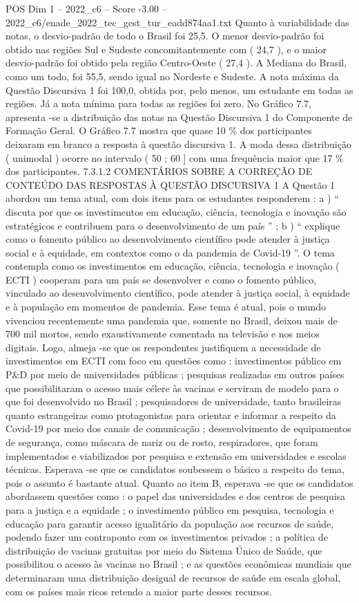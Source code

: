 \begin{textsample}{POS Dim 1 – 2022\_c6 – Score -3.00 – 2022\_c6/enade\_2022\_tec\_gest\_tur\_eadd874aa1.txt}
Quanto à variabilidade das notas, o desvio-padrão de todo o Brasil foi 25,5.
O menor desvio-padrão foi obtido nas regiões Sul e Sudeste concomitantemente com ( 24,7 ), e o maior desvio-padrão foi obtido pela região Centro-Oeste ( 27,4 ).
A Mediana do Brasil, como um todo, foi 55,5, sendo igual no Nordeste e Sudeste.
A nota máxima da Questão Discursiva 1 foi 100,0, obtida por, pelo menos, um estudante em todas as regiões.
Já a nota mínima para todas as regiões foi zero.
No Gráfico 7.7, apresenta -se a distribuição das notas na Questão Discursiva 1 do Componente de Formação Geral.
O Gráfico 7.7 mostra que quase 10 \% dos participantes deixaram em branco a resposta à questão discursiva 1.
A moda dessa distribuição ( unimodal ) ocorre no intervalo ( 50 ; 60 ] com uma frequência maior que 17 \% dos participantes. 7.3.1.2 COMENTÁRIOS SOBRE A CORREÇÃO DE CONTEÚDO DAS RESPOSTAS À QUESTÃO DISCURSIVA 1 A Questão 1 abordou um tema atual, com dois itens para os estudantes responderem : a ) “ discuta por que os investimentos em educação, ciência, tecnologia e inovação são estratégicos e contribuem para o desenvolvimento de um país ” ; b ) “ explique como o fomento público ao desenvolvimento científico pode atender à justiça social e à equidade, em contextos como o da pandemia de Covid-19 ”.
O tema contempla como os investimentos em educação, ciência, tecnologia e inovação ( ECTI ) cooperam para um país se desenvolver e como o fomento público, vinculado ao desenvolvimento científico, pode atender à justiça social, à equidade e à população em momentos de pandemia.
Esse tema é atual, pois o mundo vivenciou recentemente uma pandemia que, somente no Brasil, deixou mais de 700 mil mortos, sendo exaustivamente comentada na televisão e nos meios digitais.
Logo, almeja -se que os respondentes justifiquem a necessidade de investimentos em ECTI com foco em questões como : investimentos público em P\&D por meio de universidades públicas ; pesquisas realizadas em outros países que possibilitaram o acesso mais célere às vacinas e serviram de modelo para o que foi desenvolvido no Brasil ; pesquisadores de universidade, tanto brasileiras quanto estrangeiras como protagonistas para orientar e informar a respeito da Covid-19 por meio dos canais de comunicação ; desenvolvimento de equipamentos de segurança, como máscara de nariz ou de rosto, respiradores, que foram implementados e viabilizados por pesquisa e extensão em universidades e escolas técnicas.
Esperava -se que os candidatos soubessem o básico a respeito do tema, pois o assunto é bastante atual.
Quanto ao item B, esperava -se que os candidatos abordassem questões como : o papel das universidades e dos centros de pesquisa para a justiça e a equidade ; o investimento público em pesquisa, tecnologia e educação para garantir acesso igualitário da população aos recursos de saúde, podendo fazer um contraponto com os investimentos privados ; a política de distribuição de vacinas gratuitas por meio do Sistema Único de Saúde, que possibilitou o acesso às vacinas no Brasil ; e as questões econômicas mundiais que determinaram uma distribuição desigual de recursos de saúde em escala global, com os países mais ricos retendo a maior parte desses recursos.

\end{textsample}
